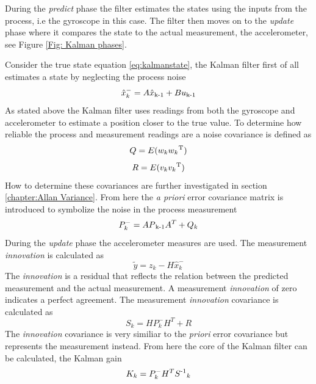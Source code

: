 \documentclass[a4paper,11pt]{kth-mag}
\begin{document}
During the \textit{predict} phase the filter estimates the states using the inputs from the process, i.e the gyroscope in this case. The filter then moves on to the \textit{update} phase where it compares the state to the actual measurement, the accelerometer, see Figure \ref{Fig: Kalman phases}.

Consider the true state equation \eqref{eq:kalmanstate}, the Kalman filter first of all estimates a state by neglecting the process noise
\begin{equation} \label{eq:Kalman first estimate}
\hat{x}^-_k = A\hat{x}\textsubscript{k-1}+Bu\textsubscript{k-1}
\end{equation}
As stated above the Kalman filter uses readings from both the gyroscope and accelerometer to estimate a position closer to the true value. To determine how reliable the process and measurement readings are a noise covariance is defined as
\begin{equation} \label{eq:covariance process noise}
Q = E(w_k w_k \textsuperscript{T})
\end{equation}
\begin{equation} \label{eq:covariance measurement noise}
R = E(v_k v_k \textsuperscript{T} )
\end{equation}
How to determine these covariances are further investigated in section  \ref{chapter:Allan Variance}.
From here the \textit{a priori} error covariance matrix is introduced to symbolize the noise in the process measurement
\begin{equation}
P^-_k = AP\textsubscript{k-1}A^T + Q_k
\end{equation}
During the \textit{update} phase the accelerometer measures are used. The measurement \textit{innovation} is calculated as
\begin{equation} \label{eq: innovation}
\tilde{y} = z_k - H\hat{x}^-_k
\end{equation}
The \textit{innovation} is a residual that reflects the relation between the predicted measurement and the actual measurement. A measurement \textit{innovation} of zero indicates a perfect agreement.
The measurement \textit{innovation} covariance is calculated as
\begin{equation} \label{eq:innovation cov}
S_k = HP^-_kH^T + R
\end{equation}
The \textit{innovation} covariance is very similiar to the \textit{priori} error covariance but represents the measurement instead. From here the core of the Kalman filter can be calculated, the Kalman gain
\begin{equation} \label{eq:Kalman gain}
K_k = P^-_kH^TS\textsuperscript{-1}_k
\end{equation}
\end{document}
